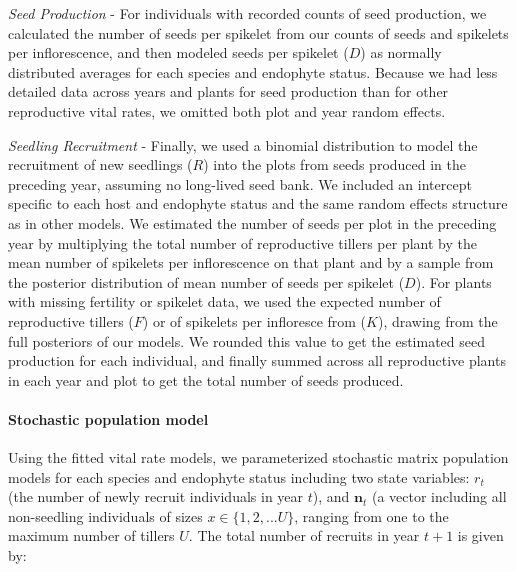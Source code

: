 \documentclass[12pt]{article}
\begin{document}
\emph{Seed Production} - For individuals with recorded counts of seed production, we calculated the number of seeds per spikelet from our counts of seeds and spikelets per inflorescence, and then modeled seeds per spikelet ($D$) as normally distributed averages for each species and endophyte status. 
Because we had less detailed data across years and plants for seed production than for other reproductive vital rates, we omitted both plot and year random effects. 

\emph{Seedling Recruitment} - Finally, we used a binomial distribution to model the recruitment of new seedlings ($R$) into the plots from seeds produced in the preceding year, assuming no long-lived seed bank. 
We included  an intercept specific to each host and endophyte status and the same random effects structure as in other models. 
We estimated the number of seeds per plot in the preceding year by multiplying the total number of reproductive tillers per plant by the mean number of spikelets per inflorescence on that plant and by a sample from the posterior distribution of mean number of seeds per spikelet ($D$).
For plants with missing fertility or spikelet data, we used the expected number of reproductive tillers ($F$) or of spikelets per infloresce from ($K$), drawing from the full posteriors of our models. 
We rounded this value to get the estimated seed production for each individual, and finally summed across all reproductive plants in each year and plot to get the total number of seeds produced. 

\paragraph*{Stochastic population model}
Using the fitted vital rate models, we parameterized stochastic matrix population models for each species and endophyte status including two state variables: $r_{t}$ (the number of newly recruit individuals in year $t$), and $\textbf{n}_{t}$ (a vector including all non-seedling individuals of sizes $x\in\{1,2,...U\} $, ranging from one to the maximum number of tillers $U$. 
The total number of recruits in year $t+1$ is given by:
\end{document}
